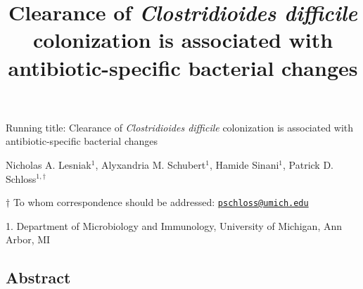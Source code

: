 \documentclass[11pt,]{article}
\title{\textbf{Clearance of \emph{Clostridioides difficile}
colonization is associated with antibiotic-specific bacterial changes}}
\author{}
\date{}
\begin{document}
\maketitle

\vspace{30mm}

Running title: Clearance of \emph{Clostridioides difficile} colonization
is associated with antibiotic-specific bacterial changes

\vspace{20mm}

Nicholas A. Lesniak\(^1\), Alyxandria M. Schubert\(^1\), Hamide
Sinani\(^1\), Patrick D. Schloss\(^{1,\dagger}\)

\vspace{30mm}

\(\dagger\) To whom correspondence should be addressed:
\href{mailto:pschloss@umich.edu}{\nolinkurl{pschloss@umich.edu}}

1. Department of Microbiology and Immunology, University of Michigan,
Ann Arbor, MI

\newpage
\linenumbers

\hypertarget{abstract}{%
\subsection{Abstract}\label{abstract}}
\end{document}
